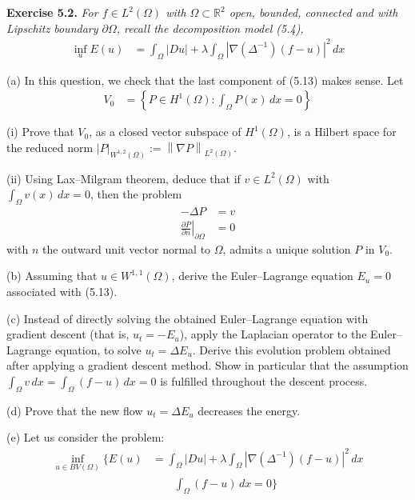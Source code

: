 \documentclass[12pt,letterpaper]{article}
\newcommand{\R}{\mathbb R}
\newcommand{\norm}[1]{\left\lVert #1\right\rVert}
\newcommand{\exercise}[1]{%
  \par\bigskip\noindent\textbf{Exercise #1.}\enspace}
\newenvironment{statement}{\itshape\ignorespaces}{\par}
\begin{document}
\clearpage
\exercise{5.2}
\begin{statement}
For $f\in L^2(\Omega)$ with $\Omega\subset\R^2$ open, bounded,
connected and with Lipschitz boundary $\partial\Omega$, recall the
decomposition model (5.4),
\begin{align*}
 \inf_u E(u)
 &=\int_\Omega|Du|
   +\lambda\int_\Omega|\nabla(\Delta^{-1})(f-u)|^2\,dx
 \tag{5.13}
\end{align*}
\par\smallskip
(a) In this question, we check that the last component of (5.13)
makes sense. Let
\begin{align*}
 V_0&=\left\{P\in H^1(\Omega):\int_\Omega P(x)\,dx=0\right\}
\end{align*}
\par\smallskip
(i) Prove that $V_0$, as a closed vector subspace of $H^1(\Omega)$,
is a Hilbert space for the reduced norm
$|P|_{W^{1,2}(\Omega)}:=\norm{\nabla P}_{L^2(\Omega)}$.
\par\smallskip
(ii) Using Lax--Milgram theorem, deduce that if $v\in L^2(\Omega)$
with $\int_\Omega v(x)\,dx=0$, then the problem
\begin{align*}
 -\Delta P&=v\\
 \left.\frac{\partial P}{\partial n}\right|_{\partial\Omega}&=0
\end{align*}
with $n$ the outward unit vector normal to $\Omega$, admits a unique
solution $P$ in $V_0$.
\par\smallskip
(b) Assuming that $u\in W^{1,1}(\Omega)$, derive the Euler--Lagrange
equation $E_u=0$ associated with (5.13).
\par\smallskip
(c) Instead of directly solving the obtained Euler--Lagrange equation
with gradient descent (that is, $u_t=-E_u$), apply the Laplacian
operator to the Euler--Lagrange equation, to solve $u_t=\Delta E_u$.
Derive this evolution problem obtained after applying a gradient
descent method. Show in particular that the assumption
$\int_\Omega v\,dx=\int_\Omega(f-u)\,dx=0$ is fulfilled throughout
the descent process.
\par\smallskip
(d) Prove that the new flow $u_t=\Delta E_u$ decreases the energy.
\par\smallskip
(e) Let us consider the problem:
\begin{align*}
 \inf_{u\in BV(\Omega)}\biggl\{E(u)
 &=\int_\Omega|Du|
   +\lambda\int_\Omega|\nabla(\Delta^{-1})(f-u)|^2\,dx\\
 &\qquad\int_\Omega(f-u)\,dx=0\biggr\}
 \tag{5.14}
\end{align*}

\end{statement}
\end{document}
